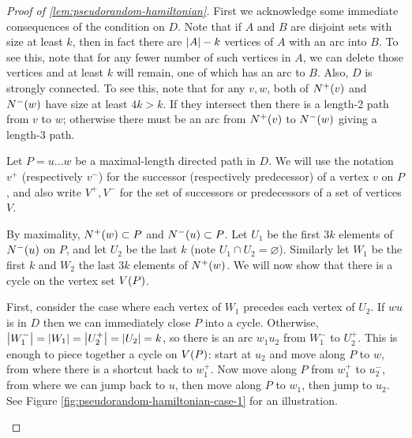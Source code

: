 \documentclass[11pt,english]{article}
\theoremstyle{plain}
\theoremstyle{definition}
\theoremstyle{definition}
\theoremstyle{plain}
\theoremstyle{plain}
\theoremstyle{plain}
\theoremstyle{plain}
\theoremstyle{remark}
\theoremstyle{remark}
\let\originalleft\left
\let\originalright\right
\renewcommand{\left}{\mathopen{}\mathclose\bgroup\originalleft}
\renewcommand{\right}{\aftergroup\egroup\originalright}
\begin{document}
\begin{proof}
[Proof of \ref{lem:pseudorandom-hamiltonian}]First we acknowledge
some immediate consequences of the condition on $D$. Note that if
$A$ and $B$ are disjoint sets with size at least $k$, then in fact
there are $\left|A\right|-k$ vertices of $A$ with an arc into $B$.
To see this, note that for any fewer number of such vertices in $A$,
we can delete those vertices and at least $k$ will remain, one of
which has an arc to $B$. Also, $D$ is strongly connected. To see
this, note that for any $v,w$, both of $N^{+}\left(v\right)$ and
$N^{-}\left(w\right)$ have size at least $4k>k$. If they intersect
then there is a length-2 path from $v$ to $w$; otherwise there must
be an arc from $N^{+}\left(v\right)$ to $N^{-}\left(w\right)$ giving
a length-3 path.

Let $P=u\dots w$ be a maximal-length directed path in $D$. We will
use the notation $v^{+}$ (respectively $v^{-}$) for the successor
(respectively predecessor) of a vertex $v$ on $P$, and also write
$V^{+},V^{-}$ for the set of successors or predecessors of a set
of vertices $V$.

By maximality, $N^{+}\left(w\right)\subset P$ and $N^{-}\left(u\right)\subset P$.
Let $U_{1}$ be the first $3k$ elements of $N^{-}\left(u\right)$
on $P$, and let $U_{2}$ be the last $k$ (note $U_{1}\cap U_{2}=\varnothing$).
Similarly let $W_{1}$ be the first $k$ and $W_{2}$ the last $3k$
elements of $N^{+}\left(w\right)$. We will now show that there is
a cycle on the vertex set $V\left(P\right)$.

First, consider the case where each vertex of $W_{1}$ precedes each
vertex of $U_{2}$. If $wu$ is in $D$ then we can immediately close
$P$ into a cycle. Otherwise, $\left|W_{1}^{-}\right|=\left|W_{1}\right|=\left|U_{2}^{+}\right|=\left|U_{2}\right|=k$,
so there is an arc $w_{1}u_{2}$ from $W_{1}^{-}$ to $U_{2}^{+}$.
This is enough to piece together a cycle on $V\left(P\right)$: start
at $u_{2}$ and move along $P$ to $w$, from where there is a shortcut
back to $w_{1}^{+}$. Now move along $P$ from $w_{1}^{+}$ to $u_{2}^{-}$,
from where we can jump back to $u$, then move along $P$ to $w_{1}$,
then jump to $u_{2}$. See Figure \ref{fig:pseudorandom-hamiltonian-case-1}
for an illustration.

\begin{figure}[H]
\begin{center}
\hspace{0.5cm}
\begin{tikzpicture}[scale=0.95]


\end{tikzpicture}
\end{center}
\end{figure}
\end{proof}
\end{document}
